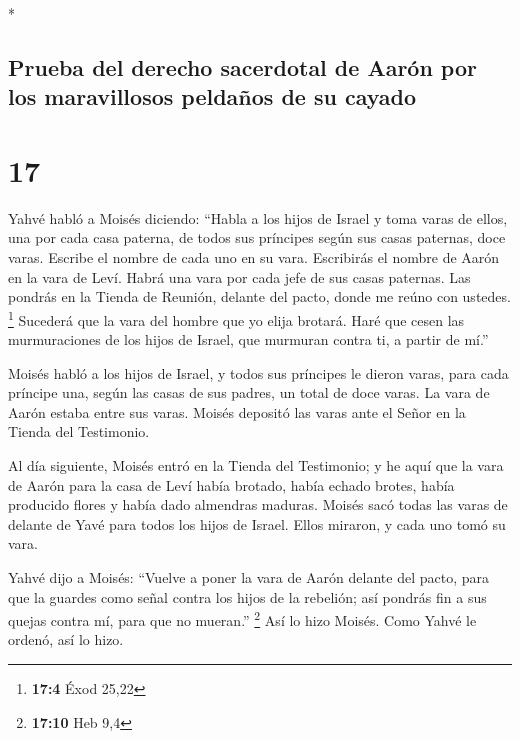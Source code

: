 \begin{paracol}{2}
\begin{otherlanguage}{english}
\end{otherlanguage}

\switchcolumn[0]*

\hypertarget{prueba-del-derecho-sacerdotal-de-aaruxf3n-por-los-maravillosos-peldauxf1os-de-su-cayado}{%
\subsection{Prueba del derecho sacerdotal de Aarón por los maravillosos
peldaños de su
cayado}\label{prueba-del-derecho-sacerdotal-de-aaruxf3n-por-los-maravillosos-peldauxf1os-de-su-cayado}}

\hypertarget{section-32}{%
\section{17}\label{section-32}}

 Yahvé habló a Moisés diciendo:  ``Habla a
los hijos de Israel y toma varas de ellos, una por cada casa paterna, de
todos sus príncipes según sus casas paternas, doce varas. Escribe el
nombre de cada uno en su vara.  Escribirás el nombre de
Aarón en la vara de Leví. Habrá una vara por cada jefe de sus casas
paternas.  Las pondrás en la Tienda de Reunión, delante
del pacto, donde me reúno con ustedes. \footnote{\textbf{17:4} Éxod
  25,22}  Sucederá que la vara del hombre que yo elija
brotará. Haré que cesen las murmuraciones de los hijos de Israel, que
murmuran contra ti, a partir de mí.''

 Moisés habló a los hijos de Israel, y todos sus príncipes
le dieron varas, para cada príncipe una, según las casas de sus padres,
un total de doce varas. La vara de Aarón estaba entre sus varas.
 Moisés depositó las varas ante el Señor en la Tienda del
Testimonio.

 Al día siguiente, Moisés entró en la Tienda del
Testimonio; y he aquí que la vara de Aarón para la casa de Leví había
brotado, había echado brotes, había producido flores y había dado
almendras maduras.  Moisés sacó todas las varas de delante
de Yavé para todos los hijos de Israel. Ellos miraron, y cada uno tomó
su vara.

 Yahvé dijo a Moisés: ``Vuelve a poner la vara de Aarón
delante del pacto, para que la guardes como señal contra los hijos de la
rebelión; así pondrás fin a sus quejas contra mí, para que no mueran.''
\footnote{\textbf{17:10} Heb 9,4}  Así lo hizo Moisés.
Como Yahvé le ordenó, así lo hizo.


\end{paracol}
